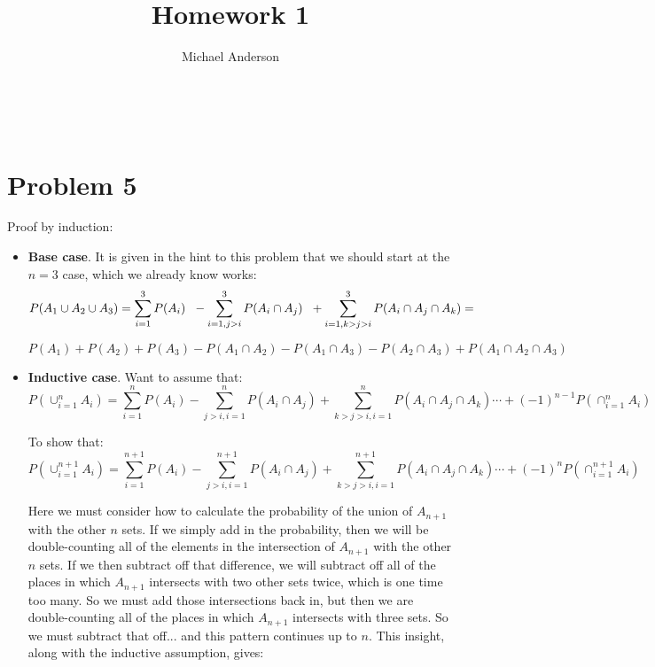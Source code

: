 \documentclass{article}
\author{Michael Anderson}
\title{Homework 1}
\begin{document}
\setlength{\parskip}{1em}
\maketitle
{}
\\
\flushleft
\newpage

\section{Problem 5}
Proof by induction:

\begin{itemize}
\item{\textbf{Base case}.}
It is given in the hint to this problem that we should start at the $n = 3$
case, which we already know works:
\[
P(A_1 \cup A_2 \cup A_3) = \sum_{i=1}^3 P(A_i) \hspace{6px} - \sum_{i=1, j>i}^3 
P(A_i \cap A_j) \hspace{6px} + \sum_{i=1, k>j>i}^3 P(A_i \cap A_j \cap A_k) =
\]

\[
P(A_1) + P(A_2) + P(A_3) - P(A_1 \cap A_2) - P(A_1 \cap A_3) - P(A_2 \cap A_3)
+ P(A_1 \cap A_2 \cap A_3)
\]

\vspace{1em}

\item{\textbf{Inductive case}.}
Want to assume that:
\[
P(\cup_{i=1}^n A_i) = \sum_{i=1}^n P(A_i) - \sum_{j>i, i=1}^n
P(A_i \cap A_j) + \sum_{k>j>i, i=1}^n P(A_i \cap A_j \cap A_k) \cdots
+(-1)^{n-1} P(\cap_{i=1}^n A_i)
\]

To show that:
\[
P(\cup_{i=1}^{n+1} A_i) = \sum_{i=1}^{n+1} P(A_i) - \sum_{j>i, i=1}^{n+1}
P(A_i \cap A_j) + \sum_{k>j>i, i=1}^{n+1} P(A_i \cap A_j \cap A_k) \cdots
+(-1)^{n} P(\cap_{i=1}^{n+1} A_i)
\]

Here we must consider how to calculate the probability of the union of $A_{n+1}$
with the other $n$ sets. If we
simply add in the probability, then we will be double-counting all of the
elements in the intersection of $A_{n+1}$ with the other $n$ sets. If we then
subtract off that
difference, we will subtract off all of the places in which $A_{n+1}$
intersects with two other sets twice, which is one time too many. So we must add
those intersections
back in, but then we are double-counting all of the places in which $A_{n+1}$
intersects with three sets. So we must subtract that off... and this pattern
continues up to $n$. This insight, along with the inductive assumption, gives:


\end{itemize}
\end{document}
